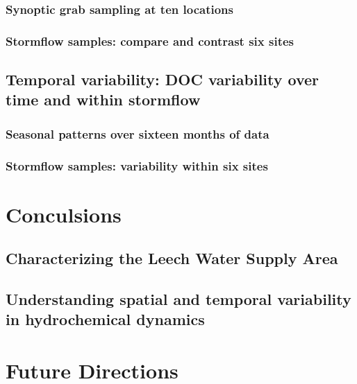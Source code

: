 \documentclass[]{article}
\begin{document}
\subsubsection{Synoptic grab sampling at ten
locations}\label{synoptic-grab-sampling-at-ten-locations}

\subsubsection{Stormflow samples: compare and contrast six
sites}\label{stormflow-samples-compare-and-contrast-six-sites}

\subsection{Temporal variability: DOC variability over time and within
stormflow}\label{temporal-variability-doc-variability-over-time-and-within-stormflow}

\subsubsection{Seasonal patterns over sixteen months of
data}\label{seasonal-patterns-over-sixteen-months-of-data}

\subsubsection{Stormflow samples: variability within six
sites}\label{stormflow-samples-variability-within-six-sites}

\section{Conculsions}\label{conculsions}

\subsection{Characterizing the Leech Water Supply
Area}\label{characterizing-the-leech-water-supply-area}

\subsection{Understanding spatial and temporal variability in
hydrochemical
dynamics}\label{understanding-spatial-and-temporal-variability-in-hydrochemical-dynamics}

\section{Future Directions}\label{future-directions}
\end{document}
